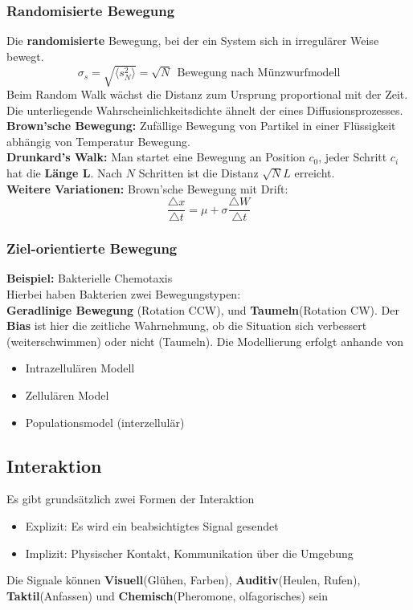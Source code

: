 \documentclass[a4paper]{article}
\begin{document}
\subsubsection{Randomisierte Bewegung}
Die \textbf{randomisierte} Bewegung, bei der ein System sich in irregulärer Weise bewegt.
$$\sigma_s=\sqrt{\langle s_N^2 \rangle} = \sqrt{N} \ \ \text{Bewegung nach Münzwurfmodell} $$ 
Beim Random Walk wächst die Distanz zum Ursprung proportional mit der Zeit. Die unterliegende Wahrscheinlichkeitsdichte ähnelt der eines Diffusionsprozesses.\\
\textbf{Brown'sche Bewegung:} Zufällige Bewegung von Partikel in einer Flüssigkeit abhängig von Temperatur Bewegung.\\
\textbf{Drunkard's Walk:} Man startet eine Bewegung an Position $c_0$, jeder Schritt $c_i$ hat die \textbf{Länge L}. Nach $N$ Schritten ist die Distanz $\sqrt{N}L$ erreicht.\\
\textbf{Weitere Variationen:} Brown'sche Bewegung mit Drift:
$$\frac{\triangle x}{\triangle t} = \mu + \sigma\frac{\triangle W}{\triangle t}$$
\subsubsection{Ziel-orientierte Bewegung}
\textbf{Beispiel:} Bakterielle Chemotaxis\\
Hierbei haben Bakterien zwei Bewegungstypen:\\
 \textbf{Geradlinige Bewegung} (Rotation CCW), und \textbf{Taumeln}(Rotation CW). Der \textbf{Bias} ist hier die zeitliche Wahrnehmung, ob die Situation sich verbessert (weiterschwimmen) oder nicht (Taumeln). Die Modellierung erfolgt anhande von
 \begin{itemize}
 	\item Intrazellulären Modell
 	\item Zellulären Model
 	\item Populationsmodel (interzellulär)
 \end{itemize}
\subsection{Interaktion}
Es gibt grundsätzlich zwei Formen der Interaktion
\begin{itemize}
	\item Explizit: Es wird ein beabsichtigtes Signal gesendet
	\item Implizit: Physischer Kontakt, Kommunikation über die Umgebung
\end{itemize}
Die Signale können \textbf{Visuell}(Glühen, Farben), \textbf{Auditiv}(Heulen, Rufen), \textbf{Taktil}(Anfassen) und \textbf{Chemisch}(Pheromone, olfagorisches) sein\\
\end{document}
